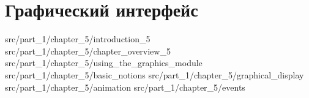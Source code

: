 \chapter{Графический интерфейс}

 {src/part_1/chapter_5/introduction_5}
 {src/part_1/chapter_5/chapter_overview_5}
 {src/part_1/chapter_5/using_the_graphics_module}
 {src/part_1/chapter_5/basic_notions}
 {src/part_1/chapter_5/graphical_display}
 {src/part_1/chapter_5/animation}
 {src/part_1/chapter_5/events}